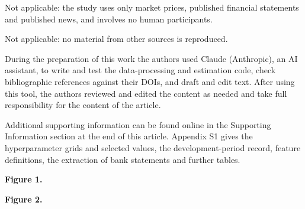 \documentclass[APA]{USG}
\begin{document}


Not applicable: the study uses only market prices, published financial statements and published
news, and involves no human participants.

Not applicable: no material from other sources is reproduced.

During the preparation of this work the authors used Claude (Anthropic), an AI assistant, to write
and test the data-processing and estimation code, check bibliographic references against their
DOIs, and draft and edit text. After using this tool, the authors reviewed and edited the content
as needed and take full responsibility for the content of the article.

Additional supporting information can be found online in the Supporting Information section at the
end of this article. Appendix S1 gives the hyperparameter grids and selected values, the
development-period record, feature definitions, the extraction of bank statements and further
tables.

{\raggedright} %

\noindent\textbf{Figure 1.} \FigOneLegend

\noindent\textbf{Figure 2.} \FigTwoLegend
\end{document}
